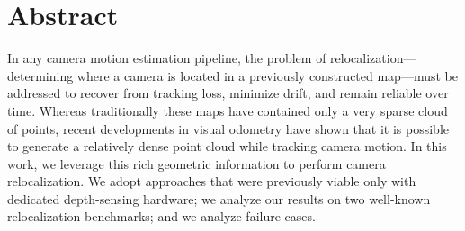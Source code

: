 \chapter{Abstract}

In any camera motion estimation pipeline, the problem of relocalization---determining where a camera is located in a previously constructed map---must be addressed to recover from tracking loss, minimize drift, and remain reliable over time. Whereas traditionally these maps have contained only a very sparse cloud of points, recent developments in visual odometry have shown that it is possible to generate a relatively dense point cloud while tracking camera motion. In this work, we leverage this rich geometric information to perform camera relocalization. We adopt approaches that were previously viable only with dedicated depth-sensing hardware; we analyze our results on two well-known relocalization benchmarks; and we analyze failure cases.
